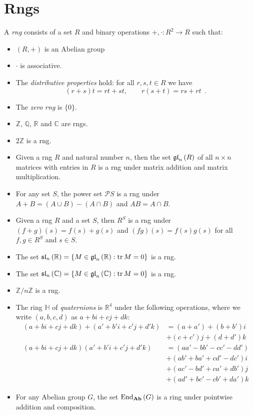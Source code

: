 \chapter{Rngs}


\begin{df}[Ring]
A \emph{rng} consists of a set $R$ and binary operations $+, \cdot : R^2 \rightarrow R$ such that:
\begin{itemize}
\item $(R,+)$ is an Abelian group
\item $\cdot$ is associative.
\item The \emph{distributive properties} hold: for all $r,s,t \in R$ we have
\[ (r+s)t = rt + st, \qquad r(s+t) = rs + rt \enspace .\]
\end{itemize}
\end{df}

\begin{ex}
\begin{itemize}
\item The \emph{zero rng} is $\{0\}$.
\item $\mathbb{Z}$, $\mathbb{Q}$, $\mathbb{R}$ and $\mathbb{C}$ are rngs.
\item
$2 \mathbb{Z}$ is a rng.
\item
Given a rng $R$ and natural number $n$, then the set $\mathfrak{gl}_{n} \left( {R} \right)$ of all $n \times n$ matrices with entries in $R$ is a rng under matrix addition and matrix multiplication.
\item
For any set $S$, the power set $\mathcal{P} S$ is a rng under $A + B = (A \cup B) - (A \cap B)$ and $AB = A \cap B$.
\item
Given a rng $R$ and a set $S$, then $R^S$ is a rng under $(f + g)(s) = f(s) + g(s)$ and $(fg)(s) = f(s)g(s)$ for all $f,g \in R^S$ and $s \in S$.
\item The set $\mathfrak{sl}_{n} \left( {\mathbb{R}} \right) = \{ M \in \mathfrak{gl}_{n} \left( {\mathbb{R}} \right) : \operatorname{tr} M = 0 \}$ is a rng.
\item The set $\mathfrak{sl}_{n} \left( {\mathbb{C}} \right) = \{ M \in \mathfrak{gl}_{n} \left( {\mathbb{C}} \right) : \operatorname{tr} M = 0 \}$ is a rng.
\item $\mathbb{Z} / n \mathbb{Z}$ is a rng.
\item The ring $\mathbb{H}$ of \emph{quaternions} is $\mathbb{R}^4$ under the following operations, where we write $(a,b,c,d)$ as $a + bi + cj + dk$:
\begin{align*}
(a + bi + cj + dk) + (a' + b'i + c'j + d'k) & = (a + a') + (b + b')i\\
&  + (c + c')j + (d + d')k \\
(a + bi + cj + dk)(a' + b'i + c'j + d'k) & = 
(aa' - bb' - cc' - dd') \\
& + (ab' + ba' + cd' - dc') i \\
& + (ac' - bd' + ca' + db')j \\
& + (ad' + bc' - cb' + da') k
\end{align*}
\item For any Abelian group $G$, the set $\mathrm{End}_{\mathbf{Ab}} \left( {G} \right)$ is a ring under pointwise addition and composition.
\end{itemize}
\end{ex}

